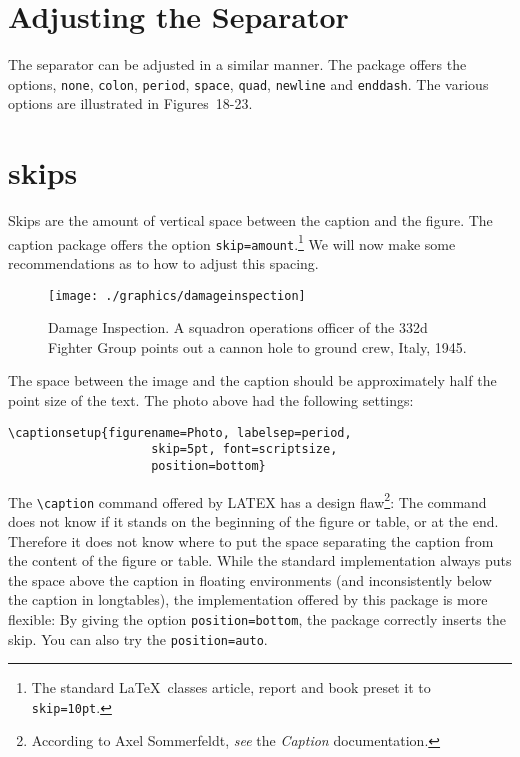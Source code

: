 \begin{Code}
\captionsetup{figurename=Figure.}
\end{Code}

\section{Adjusting the Separator}

\let\opt=\texttt
The separator can be adjusted in a similar manner. The package offers the options, \opt{none}, \opt{colon}, \opt{period}, \opt{space}, \opt{quad}, \opt{newline} and \opt{enddash}.  The various options are illustrated
in \hbox{Figures~18-23}.




\section{skips}

Skips are the amount of vertical space between the caption and the figure. The caption package offers the option
\opt{skip=amount}.\footnote{The standard \LaTeX\ classes article, report and book preset it to \opt{skip=10pt}.} We will now make some recommendations as to how to adjust this spacing.

\medskip

\begin{figure}[htp]
\centering

\captionsetup{figurename=Photo, labelsep=period, skip=5pt, position=bottom}
\texttt{[image: ./graphics/damageinspection]}
\caption{Damage Inspection.
A squadron operations officer of the 332d Fighter Group points out a cannon hole to ground crew, Italy, 1945.}
\end{figure}

\medskip

The space between the image and the caption should be approximately half the point size of the text. The photo above had the following settings:


\begin{verbatim}
\captionsetup{figurename=Photo, labelsep=period,
                    skip=5pt, font=scriptsize,
                    position=bottom}
\end{verbatim}

The \verb+\caption+ command offered by LATEX has a design flaw\footnote{According to Axel Sommerfeldt, \textit{see} the \textit{Caption} documentation.}: The command does not
know if it stands on the beginning of the figure or table, or at the end. Therefore it does
not know where to put the space separating the caption from the content of the figure
or table. While the standard implementation always puts the space above the caption
in floating environments (and inconsistently below the caption in longtables), the
implementation offered by this package is more flexible: By giving the option
\opt{position=bottom}, the package correctly inserts the skip.  You can also try the \opt{position=auto}.
\medskip

